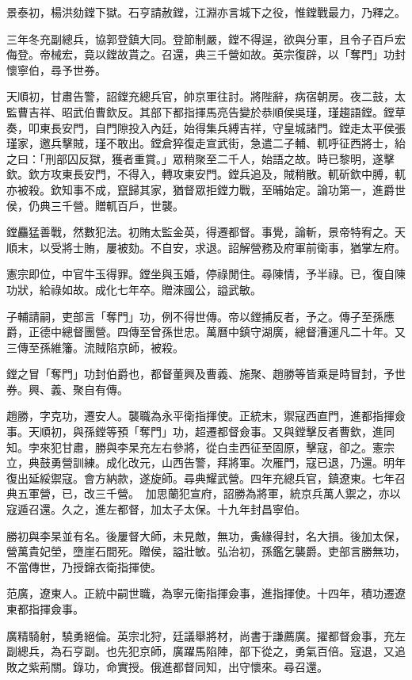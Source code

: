 \begin{pinyinscope}
景泰初，楊洪劾鏜下獄。石亨請赦鏜，江淵亦言城下之役，惟鏜戰最力，乃釋之。

三年冬充副總兵，協郭登鎮大同。登節制嚴，鏜不得逞，欲與分軍，且令子百戶宏侮登。帝械宏，竟以鏜故貰之。召還，典三千營如故。英宗復辟，以「奪門」功封懷寧伯，尋予世券。

天順初，甘肅告警，詔鏜充總兵官，帥京軍往討。將陛辭，病宿朝房。夜二鼓，太監曹吉祥、昭武伯曹欽反。其部下都指揮馬亮告變於恭順侯吳瑾，瑾趨語鏜。鏜草奏，叩東長安門，自門隙投入內廷，始得集兵縛吉祥，守皇城諸門。鏜走太平侯張瑾家，邀兵擊賊，瑾不敢出。鏜倉猝復走宣武街，急遣二子輔、軏呼征西將士，紿之曰：「刑部囚反獄，獲者重賞。」眾稍聚至二千人，始語之故。時已黎明，遂擊欽。欽方攻東長安門，不得入，轉攻東安門。鏜兵追及，賊稍散。軏斫欽中膊，軏亦被殺。欽知事不成，竄歸其家，猶督眾拒鏜力戰，至晡始定。論功第一，進爵世侯，仍典三千營。贈軏百戶，世襲。

鏜麤猛善戰，然數犯法。初賄太監金英，得遷都督。事覺，論斬，景帝特宥之。天順末，以受將士賄，屢被劾。不自安，求退。詔解營務及府軍前衛事，猶掌左府。

憲宗即位，中官牛玉得罪。鏜坐與玉婚，停祿閒住。尋陳情，予半祿。已，復自陳功狀，給祿如故。成化七年卒。贈淶國公，謚武敏。

子輔請嗣，吏部言「奪門」功，例不得世傳。帝以鏜捕反者，予之。傳子至孫應爵，正德中總督團營。四傳至曾孫世忠。萬曆中鎮守湖廣，總督漕運凡二十年。又三傳至孫維籓。流賊陷京師，被殺。

鏜之冒「奪門」功封伯爵也，都督董興及曹義、施聚、趙勝等皆乘是時冒封，予世券。興、義、聚自有傳。

趙勝，字克功，遷安人。襲職為永平衛指揮使。正統末，禦寇西直門，進都指揮僉事。天順初，與孫鏜等預「奪門」功，超遷都督僉事。又與鏜擊反者曹欽，進同知。孛來犯甘肅，勝與李杲充左右參將，從白圭西征至固原，擊寇，卻之。憲宗立，典鼓勇營訓練。成化改元，山西告警，拜將軍。次雁門，寇已退，乃還。明年復出延綏禦寇。會方納款，遂旋師。尋典耀武營。四年充總兵官，鎮遼東。七年召典五軍營，已，改三千營。加思蘭犯宣府，詔勝為將軍，統京兵萬人禦之，亦以寇遁召還。久之，進左都督，加太子太保。十九年封昌寧伯。

勝初與李杲並有名。後屢督大師，未見敵，無功，夤緣得封，名大損。後加太保，營萬貴妃塋，墮崖石間死。贈侯，謚壯敏。弘治初，孫鑑乞襲爵。吏部言勝無功，不當傳世，乃授錦衣衛指揮使。

范廣，遼東人。正統中嗣世職，為寧元衛指揮僉事，進指揮使。十四年，積功遷遼東都指揮僉事。

廣精騎射，驍勇絕倫。英宗北狩，廷議舉將材，尚書于謙薦廣。擢都督僉事，充左副總兵，為石亨副。也先犯京師，廣躍馬陷陣，部下從之，勇氣百倍。寇退，又追敗之紫荊關。錄功，命實授。俄進都督同知，出守懷來。尋召還。


\end{pinyinscope}
